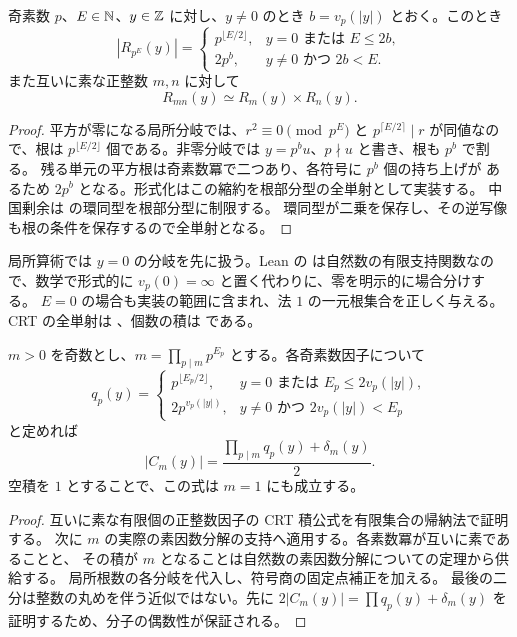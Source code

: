 \begin{lemma}[素数冪の局所根数と中国剰余]
\label{bp:fiber-local-crt}
\leanok
{}
奇素数 $p$、$E\in\mathbb N$、$y\in\mathbb Z$ に対し、$y\ne0$ のとき
$b=v_p(|y|)$ とおく。このとき
\[
 |R_{p^E}(y)|=
 \begin{cases}
 p^{\lfloor E/2\rfloor},&y=0\text{ または }E\le2b,\\
 2p^b,&y\ne0\text{ かつ }2b<E.
 \end{cases}
\]
また互いに素な正整数 $m,n$ に対して
\[
 R_{mn}(y)\simeq R_m(y)\times R_n(y).
\]
\end{lemma}
\begin{proof}
\leanok
平方が零になる局所分岐では、$r^2\equiv0\pmod{p^E}$ と
$p^{\lceil E/2\rceil}\mid r$ が同値なので、根は
$p^{\lfloor E/2\rfloor}$ 個である。非零分岐では
$y=p^bu$、$p\nmid u$ と書き、根も $p^b$ で割る。
残る単元の平方根は奇素数冪で二つあり、各符号に $p^b$ 個の持ち上げが
あるため $2p^b$ となる。形式化はこの縮約を根部分型の全単射として実装する。
中国剰余は  の環同型を根部分型に制限する。
環同型が二乗を保存し、その逆写像も根の条件を保存するので全単射となる。
\end{proof}

局所算術では $y=0$ の分岐を先に扱う。Lean の
 は自然数の有限支持関数なので、数学で形式的に
$v_p(0)=\infty$ と置く代わりに、零を明示的に場合分けする。
$E=0$ の場合も実装の範囲に含まれ、法 $1$ の一元根集合を正しく与える。
CRT の全単射は 、個数の積は
 である。

\begin{theorem}[奇数法の根数積公式]
\label{bp:fiber-root-formula}
\leanok
{}
$m>0$ を奇数とし、$m=\prod_{p\mid m}p^{E_p}$ とする。各奇素数因子について
\[
 q_p(y)=
 \begin{cases}
 p^{\lfloor E_p/2\rfloor},&y=0\text{ または }E_p\le2v_p(|y|),\\
 2p^{v_p(|y|)},&y\ne0\text{ かつ }2v_p(|y|)<E_p
 \end{cases}
\]
と定めれば
\[
 |C_m(y)|=\frac{\prod_{p\mid m}q_p(y)+\delta_m(y)}2.
\]
空積を $1$ とすることで、この式は $m=1$ にも成立する。
\end{theorem}
\begin{proof}
\leanok
互いに素な有限個の正整数因子の CRT 積公式を有限集合の帰納法で証明する。
次に $m$ の実際の素因数分解の支持へ適用する。各素数冪が互いに素であることと、
その積が $m$ となることは自然数の素因数分解についての定理から供給する。
局所根数の各分岐を代入し、符号商の固定点補正を加える。
最後の二分は整数の丸めを伴う近似ではない。先に
$2|C_m(y)|=\prod q_p(y)+\delta_m(y)$ を証明するため、分子の偶数性が保証される。
\end{proof}

